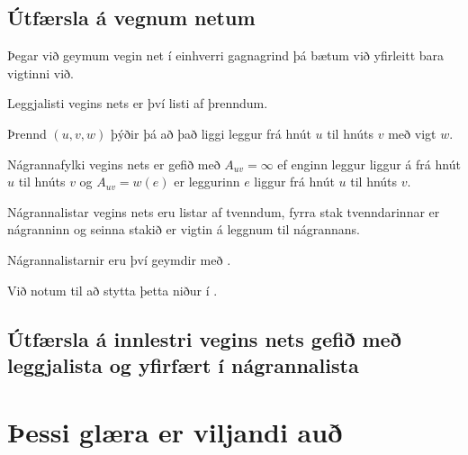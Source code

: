 \subsection{Útfærsla á vegnum netum}
{
    {
        \item<1-> Þegar við geymum vegin net í einhverri gagnagrind þá bætum við yfirleitt bara vigtinni við.
        \item<2-> Leggjalisti vegins nets er því listi af þrenndum.
        \item<3-> Þrennd $(u, v, w)$ þýðir þá að það liggi leggur frá hnút $u$ til hnúts $v$ með vigt $w$.
        \item<4-> Nágrannafylki vegins nets er gefið með $A_{uv} = \infty$ ef enginn leggur liggur á frá hnút $u$ til hnúts $v$ og
            $A_{uv} = w(e)$ er leggurinn $e$ liggur frá hnút $u$ til hnúts $v$.
        \item<5-> Nágrannalistar vegins nets eru listar af tvenndum, fyrra stak tvenndarinnar er nágranninn og seinna stakið er vigtin á leggnum
            til nágrannans.
        \item<6-> Nágrannalistarnir eru því geymdir með .
        \item<7-> Við notum  til að stytta þetta niður í .
    }
}

\subsection{Útfærsla á innlestri vegins nets gefið með leggjalista og yfirfært í nágrannalista}
{
}

\section{Þessi glæra er viljandi auð}
{
}


